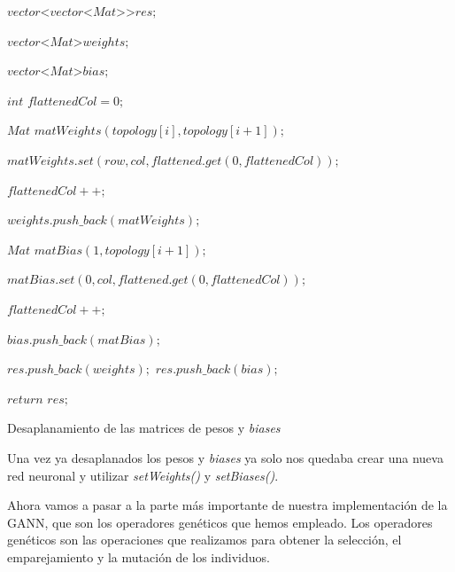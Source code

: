 \vspace{2mm}
\begin{algorithm}[H]
    $vector$\textless $vector$\textless $Mat$\textgreater\textgreater $res;$
    
    $vector$\textless $Mat$\textgreater $weights;$
    
    $vector$\textless $Mat$\textgreater $bias;$
    
    $int$ $flattenedCol = 0;$
    
    {
        $Mat$ $matWeights(topology[i], topology[i + 1]);$

        {
            {
                $matWeights.set(row, col, flattened.get(0, flattenedCol));$

                $flattenedCol++;$
            }
        }

        $weights.push\_back(matWeights);$
    }
    {
        $Mat$ $matBias(1, topology[i + 1]);$

        {
            $matBias.set(0, col, flattened.get(0, flattenedCol));$

            $flattenedCol++;$
        }

        $bias.push\_back(matBias);$
    }

    $res.push\_back(weights);$
    $res.push\_back(bias);$

    $return$ $res;$
    
	\caption{Desaplanamiento de las matrices de pesos y \textit{biases}}
	\label{alg:unflatteningOfWeightsAndBiases}
\end{algorithm}
\vspace{2mm}

Una vez ya desaplanados los pesos y \textit{biases} ya solo nos quedaba crear una nueva red neuronal y utilizar \textit{setWeights()} y \textit{setBiases()}.

Ahora vamos a pasar a la parte más importante de nuestra implementación de la GANN, que son los operadores genéticos que hemos empleado. Los operadores genéticos son las operaciones que realizamos para obtener la selección, el emparejamiento y la mutación de los individuos.

